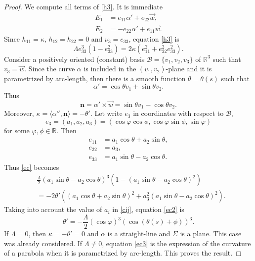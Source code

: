 \documentclass[10pt,a4paper]{amsart}
\def\n{\mathbf n}
\def\r{\mathbb R}
\begin{document}
\begin{proof}
We compute all terms of \eqref{h3}. It is immediate  
 \begin{equation*}
\begin{split}
E_1&=e_{11}\alpha'+e_{22}\vec{w},\\
E_2&=-e_{22}\alpha'+e_{11}\vec{w}.
\end{split}
\end{equation*}
Since $h_{11}=\kappa$, $h_{12}=h_{22}=0$ and $\nu_3=e_{33}$, equation \eqref{h3} is 
\begin{equation}\label{ec}
\Lambda e_{33}^3(1-e_{33}^2)=2\kappa (e_{11}^2+e_{22}^2e_{33}^2).
\end{equation}
Consider a positively oriented (constant) basis $\mathcal{B}=\{v_1,v_2,v_3\}$ of $\r^3$ such that $v_3=\vec{w}$. Since the curve $\alpha$ is included in the $(v_1,v_2)$-plane and it is parametrized by arc-length, then there is a smooth function $\theta=\theta(s)$ such that 
$$\alpha'=\cos\theta v_1+\sin\theta v_2.$$
Thus 
$$\n=\alpha'\times \vec{w}=\sin\theta v_1-\cos\theta v_2.$$
Moreover, $\kappa=\langle\alpha'',\n\rangle=-\theta'$. Let write $e_3$ in coordinates with respect to $\mathcal{B}$, 
\begin{equation}\label{cij}
e_3=(a_1,a_2,a_3)=(\cos\varphi\cos\phi,\cos\varphi\sin\phi,\sin\varphi)
\end{equation}
for some $\varphi,\phi\in\r$.  Then 
\begin{equation*}
\begin{split}
e_{11}&=a_1\cos\theta+a_2\sin\theta,\\
 e_{22}&=a_3,\\
 e_{33}&=a_1\sin\theta-a_2\cos\theta.
 \end{split}
 \end{equation*}
Thus \eqref{ec} becomes 
\begin{equation}\label{ec2}
\begin{split}&\frac{\Lambda}{2}(a_1\sin\theta-a_2\cos\theta)^3(1-(a_1\sin\theta-a_2\cos\theta)^2)\\
&=-2\theta'\left((a_1\cos\theta+a_2\sin\theta)^2+a_3^2(a_1\sin\theta-a_2\cos\theta)^2\right).
 \end{split}
 \end{equation}
 Taking into account the value of $a_i$ in \eqref{cij}, equation \eqref{ec2} is  
\begin{equation}\label{ec3}
\theta'=-\frac{\Lambda}{2}(\cos\varphi)^3(\cos(\theta(s)+\phi))^3.\end{equation}
 If $\Lambda=0$, then $\kappa=-\theta'=0$ and $\alpha$ is a straight-line and $\Sigma$ is a plane. This case was already considered. If $\Lambda\not=0$,  equation \eqref{ec3} is the expression of  the curvature of a parabola when it is parametrized by arc-length. This proves the result.
 \end{proof}
\end{document}
